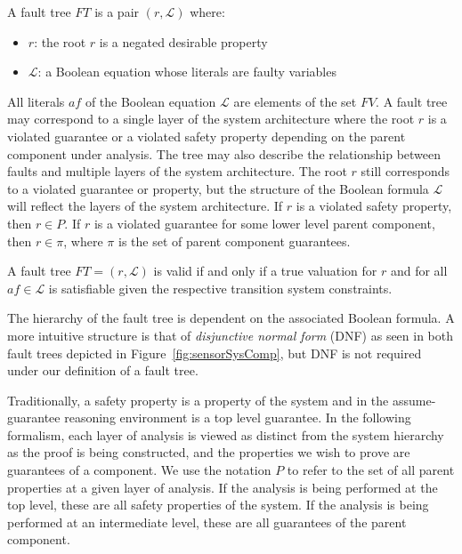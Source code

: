 \begin{definition}
A fault tree $\mathit{FT}$ is a pair $(r, \mathcal{L})$ where:
\begin{itemize}
\item[] $r$: the root $r$ is a negated desirable property
\item[] $\mathcal{L}$: a Boolean equation whose literals are faulty variables
\end{itemize}
\end{definition}

All literals $\mathit{af}$ of the Boolean equation $\mathcal{L}$ are elements of the set $\mathit{FV}$. A fault tree may correspond to a single layer of the system architecture where the root $r$ is a violated guarantee or a violated safety property depending on the parent component under analysis. The tree may also describe the relationship between faults and multiple layers of the system architecture. The root $r$ still corresponds to a violated guarantee or property, but the structure of the Boolean formula $\mathcal{L}$ will reflect the layers of the system architecture. If $r$ is a violated safety property, then $r \in P$. If $r$ is a violated guarantee for some lower level parent component, then $r \in \pi$, where $\pi$ is the set of parent component guarantees. 

\begin{definition} 
A fault tree $FT = (r, \mathcal{L})$ is valid if and only if a true valuation for $r$ and for all $\mathit{af} \in \mathcal{L}$ is satisfiable given the respective transition system constraints. 
\label{def:validFT}
\end{definition}

The hierarchy of the fault tree is dependent on the associated Boolean formula. A more intuitive structure is that of {\em disjunctive normal form} (DNF) as seen in both fault trees depicted in Figure~\ref{fig:sensorSysComp}, but DNF is not required under our definition of a fault tree. 

Traditionally, a safety property is a property of the system and in the assume-guarantee reasoning environment is a top level guarantee. In the following formalism, each layer of analysis is viewed as distinct from the system hierarchy as the proof is being constructed, and the properties we wish to prove are guarantees of a component. We use the notation $P$ to refer to the set of all parent properties at a given layer of analysis. If the analysis is being performed at the top level, these are all safety properties of the system. If the analysis is being performed at an intermediate level, these are all guarantees of the parent component.


